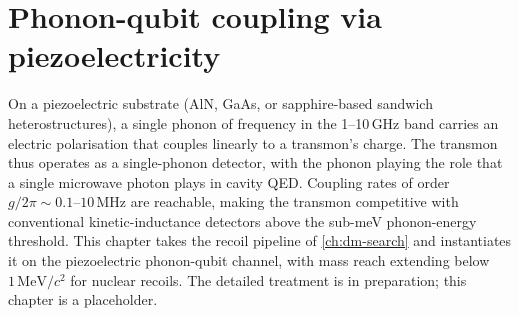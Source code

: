 \chapter{Phonon-qubit coupling via piezoelectricity}
\label{ch:phonon-qubit-piezo}

On a piezoelectric substrate (AlN, GaAs, or sapphire-based
sandwich heterostructures), a single phonon of frequency in the
1--10\,GHz band carries an electric polarisation that couples
linearly to a transmon's charge. The transmon thus operates as a
single-phonon detector, with the phonon playing the role that a
single microwave photon plays in cavity QED. Coupling rates of
order $g/2\pi\sim 0.1\text{--}10\,\text{MHz}$ are reachable, making
the transmon competitive with conventional kinetic-inductance
detectors above the sub-meV phonon-energy threshold. This chapter
takes the recoil pipeline of \cref{ch:dm-search} and instantiates
it on the piezoelectric phonon-qubit channel, with mass reach
extending below $1\,\text{MeV}/c^2$ for nuclear recoils. The
detailed treatment is in preparation; this chapter is a placeholder.
